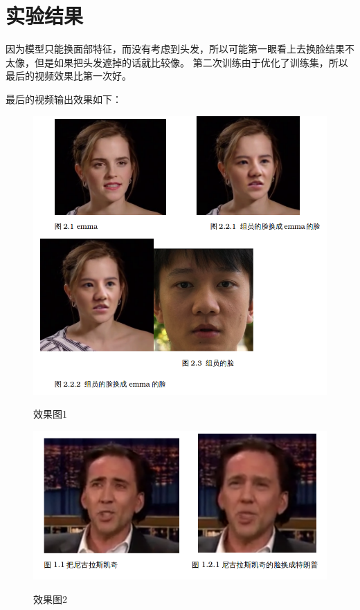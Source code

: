 \section{实验结果}
因为模型只能换面部特征，而没有考虑到头发，所以可能第一眼看上去换脸结果不太像，但是如果把头发遮掉的话就比较像。
第二次训练由于优化了训练集，所以最后的视频效果比第一次好。

最后的视频输出效果如下：

\begin{figure}[h!]
	\caption{效果图1}
	\centering
	\includegraphics[width=\textwidth]{figure/resources/result1.png}
	\label{fig:result1}
\end{figure}

\begin{figure}[h!]
	\caption{效果图2}
	\centering
	\includegraphics[width=\textwidth]{figure/resources/result2.png}
	\label{fig:result2}
\end{figure}


